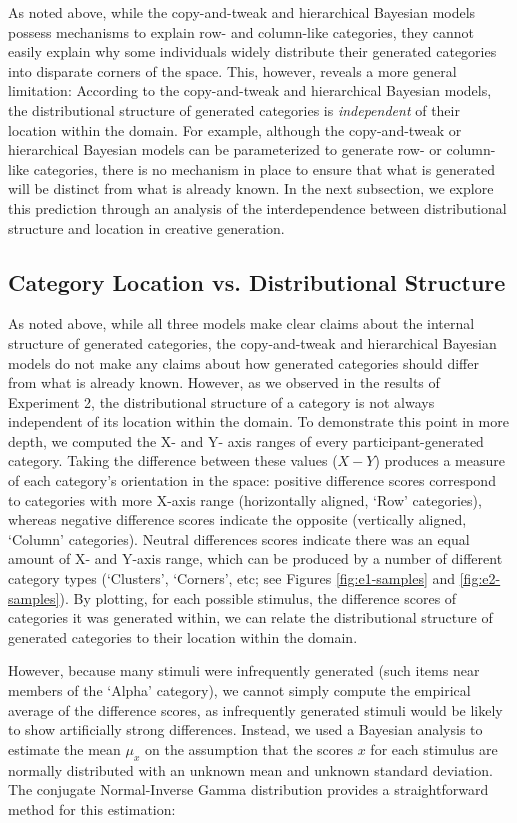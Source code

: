 \documentclass[12pt]{article}
\begin{document}
\begin{flushleft}
As noted above, while the copy-and-tweak and hierarchical Bayesian models possess mechanisms to explain row- and column-like categories, they cannot easily explain why some individuals widely distribute their generated categories into disparate corners of the space. This, however, reveals a more general limitation: According to the copy-and-tweak and hierarchical Bayesian models, the distributional structure of generated categories is {\em independent} of their location within the domain. For example, although the copy-and-tweak or hierarchical Bayesian models can be parameterized to generate row- or column-like categories, there is no mechanism in place to ensure that what is generated will be distinct from what is already known. In the next subsection, we explore this prediction through an analysis of the interdependence between distributional structure and location in creative generation.

\subsection{Category Location vs. Distributional Structure}

As noted above, while all three models make clear claims about the internal structure of generated categories, the copy-and-tweak and hierarchical Bayesian models do not make any claims about how generated categories should differ from what is already known. However, as we observed in the results of Experiment 2, the distributional structure of a category is not always independent of its location within the domain. To demonstrate this point in more depth, we computed the X- and Y- axis ranges of every participant-generated category. Taking the difference between these values ($X-Y$) produces a measure of each category's orientation in the space: positive difference scores correspond to categories with more X-axis range (horizontally aligned, `Row' categories), whereas negative difference scores indicate the opposite (vertically aligned, `Column' categories). Neutral differences scores indicate there was an equal amount of X- and Y-axis range, which can be produced by a number of different category types (`Clusters', `Corners', etc; see Figures \ref{fig:e1-samples} and \ref{fig:e2-samples}). By plotting, for each possible stimulus, the difference scores of categories it was generated within, we can relate the distributional structure of generated categories to their location within the domain.

However, because many stimuli were infrequently generated (such items near members of the `Alpha' category), we cannot simply compute the empirical average of the difference scores, as infrequently generated stimuli would be likely to show artificially strong differences. Instead, we used a Bayesian analysis to estimate the mean $\mu_x$ on the assumption that the scores $x$ for each stimulus are normally distributed with an unknown mean and unknown standard deviation. The conjugate Normal-Inverse Gamma distribution provides a straightforward method for this estimation:



\end{flushleft}
\end{document}
